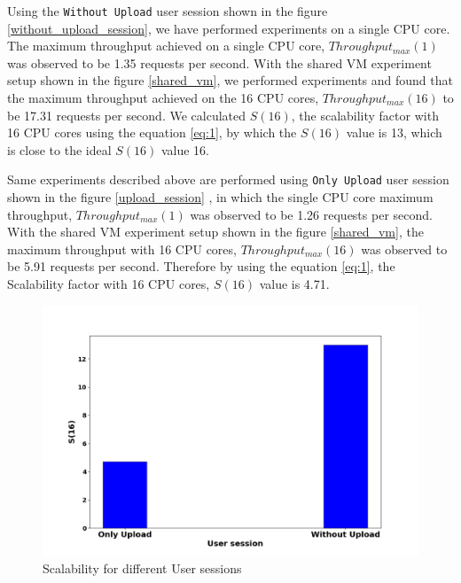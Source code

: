 \documentclass[sigconf]{acmart}
\begin{document}
Using the \texttt{Without Upload}  user session shown in the figure \ref{without_upload_session}, we have performed experiments on a single CPU core. The maximum throughput achieved on a single CPU core, $Throughput_{max}(1)$ was observed to be 1.35 requests per second. With the shared VM experiment setup shown in the figure \ref{shared_vm}, we performed experiments and found that the maximum throughput achieved on the 16 CPU cores, $Throughput_{max}(16)$ to be 17.31 requests per second. We calculated $S(16)$, the scalability factor with 16 CPU cores using the equation \ref{eq:1}, by which  the $S(16)$ value is 13, which is close to the ideal $S(16)$ value 16.

Same experiments described above are performed using \texttt{Only Upload} user session shown in the figure \ref{upload_session} , in which the single CPU core maximum throughput,  $Throughput_{max}(1)$ was observed to be 1.26 requests per second.  With the shared VM experiment setup shown in the figure  \ref{shared_vm}, the  maximum throughput with 16 CPU cores, $Throughput_{max}(16)$  was observed to be 5.91 requests per second. Therefore by using the equation \ref{eq:1}, the Scalability factor with 16 CPU cores, $S(16)$ value is 4.71.


\begin{figure}[!htb]
  \centering
  \includegraphics[width=\linewidth]{Pictures/upload_vs_without_upload.png}
  \caption{Scalability for different User sessions}
  \label{compare_user_sessions}
\end{figure}
\end{document}
